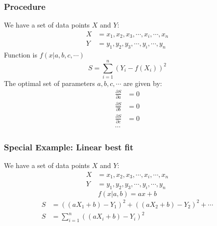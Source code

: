 \documentclass{beamer}
\begin{document}
\begin{frame}
	\frametitle{Procedure}
	We have a set of data points $X$ and $Y$:
	\begin{align*}
		X &= x_1, x_2, x_3, \cdots, x_i, \cdots, x_n\\
		Y &= y_1, y_2, y_3, \cdots, y_i, \cdots, y_n
	\end{align*}
	Function is $f(x|{a, b, c, \cdots})$\\
	\begin{equation*}
		S = \sum_{i=1}^{n}\left(Y_i-f(X_i)\right)^2
	\end{equation*}
	The optimal set of parameters $a, b, c, \cdots$ are given by:
	\begin{align*}
		\frac{\partial S}{\partial a}&=0\\
		\frac{\partial S}{\partial b}&=0\\
		\frac{\partial S}{\partial c}&=0\\
		\cdots
	\end{align*}
\end{frame}



\begin{frame}
	\frametitle{Special Example: Linear best fit}
	We have a set of data points $X$ and $Y$:
	\begin{align*}
		X &= x_1, x_2, x_3, \cdots, x_i, \cdots, x_n\\
		Y &= y_1, y_2, y_3, \cdots, y_i, \cdots, y_n
	\end{align*}
	\begin{equation*}
		f(x|{a, b})=ax+b
	\end{equation*}
	\begin{align*}
		S &= \left((aX_1+b)-Y_1\right)^2+\left((aX_2+b)-Y_2\right)^2+\cdots\\
		S &= \sum_{i=1}^{n}\left((aX_i+b)-Y_i\right)^2
	\end{align*}
\end{frame}
\end{document}
